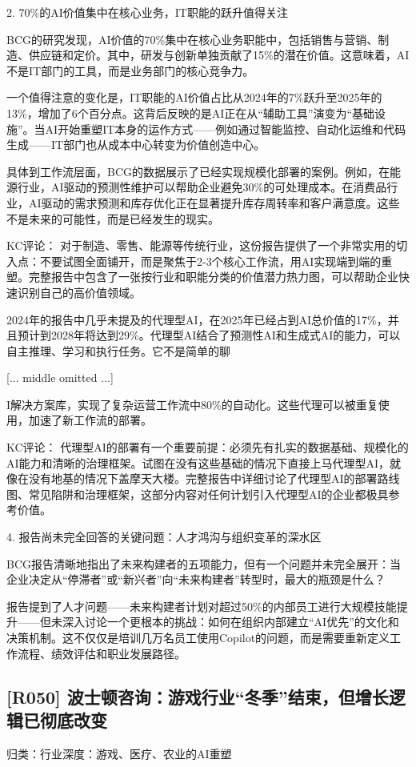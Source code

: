 \documentclass[11pt]{ctexart}
\begin{document}
2. 70\%的AI价值集中在核心业务，IT职能的跃升值得关注

BCG的研究发现，AI价值的70\%集中在核心业务职能中，包括销售与营销、制造、供应链和定价。其中，研发与创新单独贡献了15\%的潜在价值。这意味着，AI不是IT部门的工具，而是业务部门的核心竞争力。

一个值得注意的变化是，IT职能的AI价值占比从2024年的7\%跃升至2025年的13\%，增加了6个百分点。这背后反映的是AI正在从“辅助工具”演变为“基础设施”。当AI开始重塑IT本身的运作方式——例如通过智能监控、自动化运维和代码生成——IT部门也从成本中心转变为价值创造中心。

具体到工作流层面，BCG的数据展示了已经实现规模化部署的案例。例如，在能源行业，AI驱动的预测性维护可以帮助企业避免30\%的可处理成本。在消费品行业，AI驱动的需求预测和库存优化正在显著提升库存周转率和客户满意度。这些不是未来的可能性，而是已经发生的现实。

KC评论： 对于制造、零售、能源等传统行业，这份报告提供了一个非常实用的切入点：不要试图全面铺开，而是聚焦于2-3个核心工作流，用AI实现端到端的重塑。完整报告中包含了一张按行业和职能分类的价值潜力热力图，可以帮助企业快速识别自己的高价值领域。

2024年的报告中几乎未提及的代理型AI，在2025年已经占到AI总价值的17\%，并且预计到2028年将达到29\%。代理型AI结合了预测性AI和生成式AI的能力，可以自主推理、学习和执行任务。它不是简单的聊

[... middle omitted ...]

I解决方案库，实现了复杂运营工作流中80\%的自动化。这些代理可以被重复使用，加速了新工作流的部署。

KC评论： 代理型AI的部署有一个重要前提：必须先有扎实的数据基础、规模化的AI能力和清晰的治理框架。试图在没有这些基础的情况下直接上马代理型AI，就像在没有地基的情况下盖摩天大楼。完整报告中详细讨论了代理型AI的部署路线图、常见陷阱和治理框架，这部分内容对任何计划引入代理型AI的企业都极具参考价值。

4. 报告尚未完全回答的关键问题：人才鸿沟与组织变革的深水区

BCG报告清晰地指出了未来构建者的五项能力，但有一个问题并未完全展开：当企业决定从“停滞者”或“新兴者”向“未来构建者”转型时，最大的瓶颈是什么？

报告提到了人才问题——未来构建者计划对超过50\%的内部员工进行大规模技能提升——但未深入讨论一个更根本的挑战：如何在组织内部建立“AI优先”的文化和决策机制。这不仅仅是培训几万名员工使用Copilot的问题，而是需要重新定义工作流程、绩效评估和职业发展路径。

\subsection{[R050] 波士顿咨询：游戏行业“冬季”结束，但增长逻辑已彻底改变}
{\small\color{refgray}归类：行业深度：游戏、医疗、农业的AI重塑}
\end{document}
